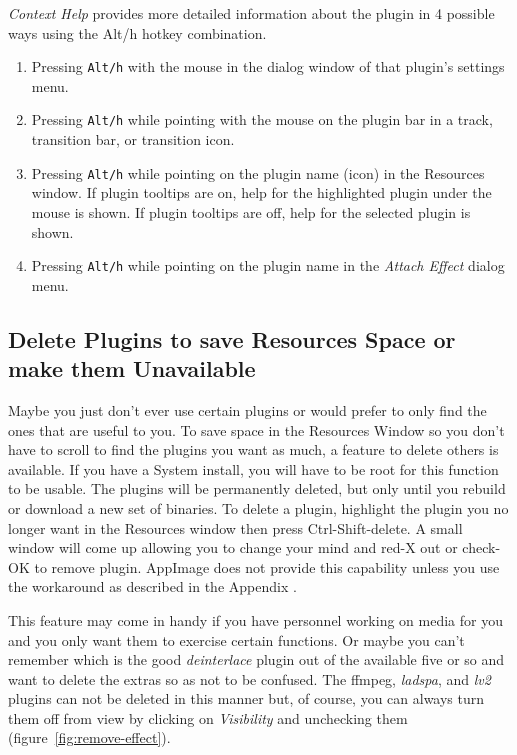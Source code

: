 \textit{Context Help} provides more detailed information about the plugin in 4 possible
ways using the Alt/h hotkey combination. 
\begin{enumerate}
        \item Pressing \texttt{Alt/h} with the mouse in the dialog window of that plugin's settings menu.
        \item Pressing \texttt{Alt/h} while pointing with the mouse on the plugin bar in a track, transition bar, or transition icon.
        \item Pressing \texttt{Alt/h} while pointing on the plugin name (icon) in the Resources window. If plugin tooltips are on, help for the highlighted plugin under the mouse is shown. If plugin tooltips are off, help for the selected plugin is shown.
        \item Pressing \texttt{Alt/h} while pointing on the plugin name in the \textit{Attach Effect} dialog menu.
\end{enumerate}

\subsection{Delete Plugins to save Resources Space or make them Unavailable}%
\label{sub:delete_plugin_resources_unavailable}

Maybe you just don't ever use certain plugins or would prefer to only find the ones that are useful to you. To save space in the Resources Window so you don't have to scroll to find the plugins you want as much, a feature to delete others is available. If you have a System install, you will have to be root for this function to be usable. The plugins will be permanently deleted, but only until you rebuild or download a new set of \CGG{} binaries. To delete a plugin, highlight the plugin you no longer want in the Resources window then press Ctrl-Shift-delete. A small window will come up allowing you to change your mind and red-X out or check-OK to remove plugin. 
AppImage does not provide this capability unless you use the workaround as described in the Appendix .

This feature may come in handy if you have personnel working on media for you and you only want them to exercise certain functions. Or maybe you can't remember which is the good \textit{deinterlace} plugin out of the available five or so and want to delete the extras so as not to be confused. The ffmpeg, \textit{ladspa}, and \textit{lv2} plugins can not be deleted in this manner but, of course, you can always turn them off from view by clicking on \textit{Visibility} and unchecking them (figure~\ref{fig:remove-effect}).

